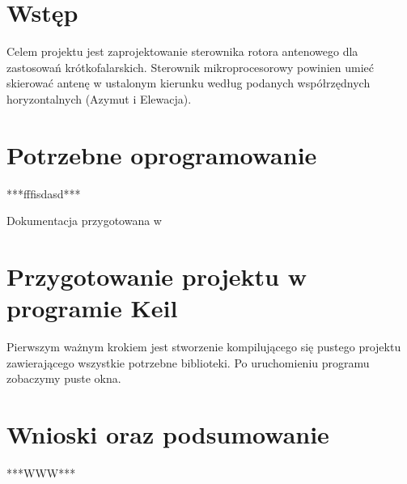 \documentclass[12pt,a4paper]{mwart}
\begin{document}
	
	

	\section{Wstęp}
	Celem projektu jest zaprojektowanie sterownika rotora antenowego dla zastosowań krótkofalarskich. Sterownik mikroprocesorowy powinien umieć skierować antenę w ustalonym kierunku według podanych współrzędnych horyzontalnych (Azymut i Elewacja).

	\section{Potrzebne oprogramowanie}
	***fffisdasd***

	Dokumentacja przygotowana w \LaTeXe

	\section{Przygotowanie projektu w programie Keil}
	Pierwszym ważnym krokiem jest stworzenie kompilującego się pustego projektu zawierającego wszystkie potrzebne biblioteki. Po uruchomieniu programu zobaczymy puste okna.
	
	\section{Wnioski oraz podsumowanie}
	***WWW***
\end{document}
